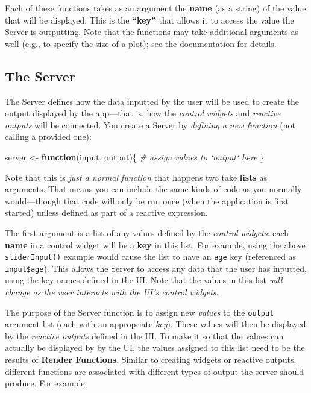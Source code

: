 \documentclass[]{book}
\newenvironment{Shaded}{\begin{snugshade}}{\end{snugshade}}
\newcommand{\StringTok}[1]{\textcolor[rgb]{0.31,0.60,0.02}{#1}}
\newcommand{\CommentTok}[1]{\textcolor[rgb]{0.56,0.35,0.01}{\textit{#1}}}
\newcommand{\ControlFlowTok}[1]{\textcolor[rgb]{0.13,0.29,0.53}{\textbf{#1}}}
\newcommand{\NormalTok}[1]{#1}
\theoremstyle{definition}
\theoremstyle{definition}
\theoremstyle{remark}
\begin{document}
Each of these functions takes as an argument the \textbf{name} (as a
string) of the value that will be displayed. This is the
\textbf{``key''} that allows it to access the value the Server is
outputting. Note that the functions may take additional arguments as
well (e.g., to specify the size of a plot); see
\href{http://shiny.rstudio.com/reference/shiny/latest/}{the
documentation} for details.

\subsection{The Server}\label{the-server}

The Server defines how the data inputted by the user will be used to
create the output displayed by the app---that is, how the \emph{control
widgets} and \emph{reactive outputs} will be connected. You create a
Server by \emph{defining a new function} (not calling a provided one):

\begin{Shaded}
\begin{Highlighting}[]
\NormalTok{server <-}\StringTok{ }\ControlFlowTok{function}\NormalTok{(input, output)\{}
  \CommentTok{# assign values to `output` here}
\NormalTok{\}}
\end{Highlighting}
\end{Shaded}

Note that this is \emph{just a normal function} that happens two take
\textbf{lists} as arguments. That means you can include the same kinds
of code as you normally would---though that code will only be run once
(when the application is first started) unless defined as part of a
reactive expression.

The first argument is a list of any values defined by the \emph{control
widgets}: each \textbf{name} in a control widget will be a \textbf{key}
in this list. For example, using the above \texttt{sliderInput()}
example would cause the list to have an \texttt{age} key (referenced as
\texttt{input\$age}). This allows the Server to access any data that the
user has inputted, using the key names defined in the UI. Note that the
values in this list \emph{will change as the user interacts with the
UI's control widgets}.

The purpose of the Server function is to assign new \emph{values} to the
\texttt{output} argument list (each with an appropriate \emph{key}).
These values will then be displayed by the \emph{reactive outputs}
defined in the UI. To make it so that the values can actually be
displayed by by the UI, the values assigned to this list need to be the
results of \textbf{Render Functions}. Similar to creating widgets or
reactive outputs, different functions are associated with different
types of output the server should produce. For example:
\end{document}
